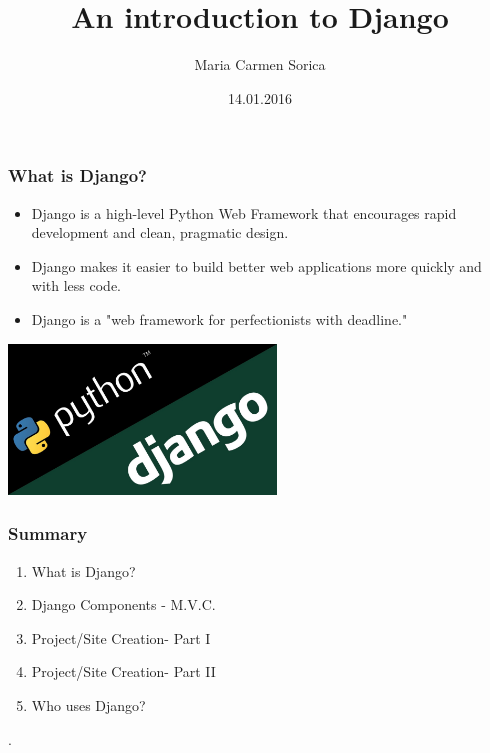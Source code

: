 \documentclass{beamer}
\title{An introduction to Django}
\author{Maria Carmen Sorica}
\institute{Universitatea Tehnic\u{a} din Cluj-Napoca}
\date{14.01.2016}
\begin{document}
\maketitle

\begin{frame}
\frametitle{What is Django?}
\begin{itemize}
    \item Django is a high-level Python Web Framework that encourages rapid development and clean, pragmatic design.
    \item Django makes it easier to build better web applications more quickly and with less code.
    \item Django is a "web framework for perfectionists with deadline."

\end{itemize}
\begin{center}
\includegraphics[height = 4cm]{logo.jpg} 
\end{center} 
\end{frame}
 
 


\begin{frame}
\frametitle{Summary}
\begin{enumerate}
            \item What is Django?
            \item Django Components - M.V.C.
            \item Project/Site Creation- Part I
            \item Project/Site Creation- Part II
            \item Who uses Django?

        \end{enumerate}.
\end{frame}
\end{document}
